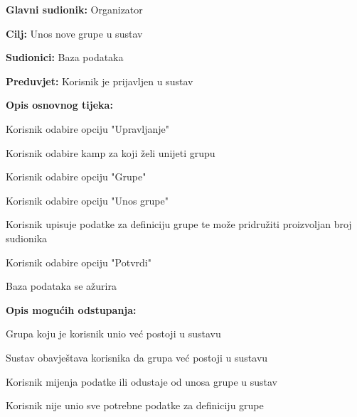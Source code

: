 					\noindent {}
					\begin{packed_item}
						
						\item \textbf{Glavni sudionik: }Organizator
						\item  \textbf{Cilj:} Unos nove grupe u sustav
						\item  \textbf{Sudionici:} Baza podataka
						\item  \textbf{Preduvjet:} Korisnik je prijavljen u sustav
						\item  \textbf{Opis osnovnog tijeka:}
						
						\item[] \begin{packed_enum}
							
							
							\item Korisnik odabire opciju "Upravljanje"
							\item Korisnik odabire kamp za koji želi unijeti grupu
							\item Korisnik odabire opciju "Grupe"
							\item Korisnik odabire opciju "Unos grupe"
							\item Korisnik upisuje podatke za definiciju grupe te može pridružiti proizvoljan broj sudionika 
							\item Korisnik odabire opciju "Potvrdi"
							\item Baza podataka se ažurira
						\end{packed_enum}
						
						\item  \textbf{Opis mogućih odstupanja:}
						
						\item[] \begin{packed_item}
							
							\item[6.a] Grupa koju je korisnik unio već postoji u sustavu
							\item[] \begin{packed_enum}
								
								\item Sustav obavještava korisnika da grupa već postoji u sustavu
								\item Korisnik mijenja podatke ili odustaje od unosa grupe u sustav 
								
								
							\end{packed_enum}
							\item[6.b] Korisnik nije unio sve potrebne podatke za definiciju grupe
							\item[] \begin{packed_enum}
								

\end{packed_enum}
\end{packed_item}
\end{packed_item}
